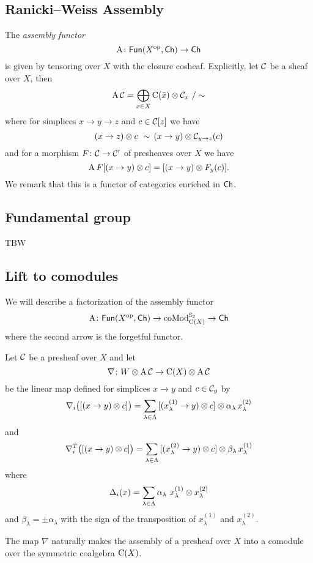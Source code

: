 \subsection{Ranicki--Weiss Assembly} \label{ss:assembly}

The \textit{assembly functor}
\[
\operatorname{A} \colon \mathsf{Fun}(X^{\mathrm{op}}, \mathsf{Ch}) \to \mathsf{Ch}
\]
is given by tensoring over $X$ with the closure cosheaf.
Explicitly, let $\mathcal{C}$ be a sheaf over $X$, then
\[
\operatorname{A} \mathcal{C} = \bigoplus_{x \in X} \operatorname{C}(\bar x) \otimes \mathcal{C}_x \ / \sim
\]
where for simplices $x \to y \to z$ and $c \in \mathcal{C}[z]$ we have
\[
(x \to z) \otimes c \ \sim \, (x \to y) \otimes \mathcal{C}_{y \to z}(c)
\]
and for a morphism $F \colon \mathcal{C} \to \mathcal{C}'$ of presheaves over $X$ we have
\[
\operatorname{A} F[(x \to y) \otimes c] = [(x \to y) \otimes F_y(c)].
\]
We remark that this is a functor of categories enriched in $\mathsf{Ch}$.

\subsection{Fundamental group}

TBW

\subsection{Lift to comodules}

We will describe a factorization of the assembly functor
\[
\operatorname{A} \colon \mathsf{Fun}(X^{\mathrm{op}}, \mathsf{Ch}) \to \operatorname{coMod}^{\mathbb{S}_2}_{\operatorname{C}(X)} \to \mathsf{Ch}
\]
where the second arrow is the forgetful functor.

Let $\mathcal{C}$ be a presheaf over $X$ and let
\[
\nabla \colon W \otimes \operatorname{A} \mathcal{C} \to \operatorname{C}(X) \otimes \operatorname{A} \mathcal{C}
\]
be the linear map defined for simplices $x \to y$ and $c \in \mathcal{C}_y$ by
\[
\nabla_i \big( [(x \to y) \otimes c] \big) =
\sum_{\lambda \in \Lambda} {[(x_\lambda^{(1)} \to y) \otimes c]} \otimes \alpha_\lambda \, x_\lambda^{(2)}
\]
and
\[
\nabla_i^T \big( [(x \to y) \otimes c] \big) =
\sum_{\lambda \in \Lambda} {[(x_\lambda^{(2)} \to y) \otimes c]} \otimes \beta_\lambda \, x_\lambda^{(1)}
\]
where
\[
\Delta_i(x) = \sum_{\lambda \in \Lambda} \alpha_\lambda \ x_\lambda^{(1)} \otimes x_\lambda^{(2)}
\]
and
$\beta_\lambda = \pm \alpha_\lambda$ with the sign of the transposition of $x_\lambda^{(1)}$ and $x_\lambda^{(2)}$.

\begin{lemma*}
	The map $\nabla$ naturally makes the assembly of a presheaf over $X$ into a comodule over the symmetric coalgebra $\operatorname{C}(X)$.
\end{lemma*}

